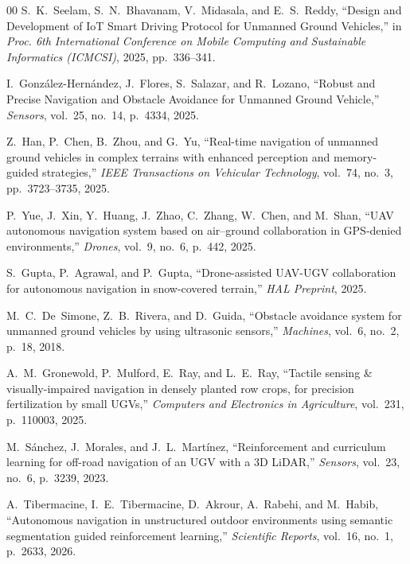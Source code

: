 \documentclass[runningheads]{llncs}
\begin{document}
\begin{thebibliography}{00}
S.~K.~Seelam, S.~N.~Bhavanam, V.~Midasala, and E.~S.~Reddy, ``Design and Development of IoT Smart Driving Protocol for Unmanned Ground Vehicles,'' in \textit{Proc. 6th International Conference on Mobile Computing and Sustainable Informatics (ICMCSI)}, 2025, pp.~336--341.

I.~Gonz\'{a}lez-Hern\'{a}ndez, J.~Flores, S.~Salazar, and R.~Lozano, ``Robust and Precise Navigation and Obstacle Avoidance for Unmanned Ground Vehicle,'' \textit{Sensors}, vol.~25, no.~14, p.~4334, 2025.

Z.~Han, P.~Chen, B.~Zhou, and G.~Yu, ``Real-time navigation of unmanned ground vehicles in complex terrains with enhanced perception and memory-guided strategies,'' \textit{IEEE Transactions on Vehicular Technology}, vol.~74, no.~3, pp.~3723--3735, 2025.

P.~Yue, J.~Xin, Y.~Huang, J.~Zhao, C.~Zhang, W.~Chen, and M.~Shan, ``UAV autonomous navigation system based on air--ground collaboration in GPS-denied environments,'' \textit{Drones}, vol.~9, no.~6, p.~442, 2025.

S.~Gupta, P.~Agrawal, and P.~Gupta, ``Drone-assisted UAV-UGV collaboration for autonomous navigation in snow-covered terrain,'' \textit{HAL Preprint}, 2025.

M.~C.~De~Simone, Z.~B.~Rivera, and D.~Guida, ``Obstacle avoidance system for unmanned ground vehicles by using ultrasonic sensors,'' \textit{Machines}, vol.~6, no.~2, p.~18, 2018.

A.~M.~Gronewold, P.~Mulford, E.~Ray, and L.~E.~Ray, ``Tactile sensing \& visually-impaired navigation in densely planted row crops, for precision fertilization by small UGVs,'' \textit{Computers and Electronics in Agriculture}, vol.~231, p.~110003, 2025.

M.~S\'{a}nchez, J.~Morales, and J.~L.~Mart\'{i}nez, ``Reinforcement and curriculum learning for off-road navigation of an UGV with a 3D LiDAR,'' \textit{Sensors}, vol.~23, no.~6, p.~3239, 2023.

A.~Tibermacine, I.~E.~Tibermacine, D.~Akrour, A.~Rabehi, and M.~Habib, ``Autonomous navigation in unstructured outdoor environments using semantic segmentation guided reinforcement learning,'' \textit{Scientific Reports}, vol.~16, no.~1, p.~2633, 2026.


\end{thebibliography}
\end{document}
